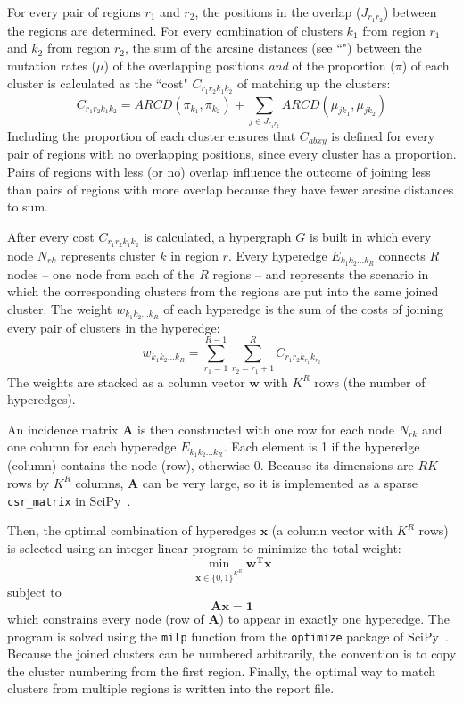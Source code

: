 \documentclass[11pt]{article}
\begin{document}
For every pair of regions $r_1$ and $r_2$, the positions in the overlap ($J_{r_1r_2}$) between the regions are determined.
For every combination of clusters $k_1$ from region $r_1$ and $k_2$ from region $r_2$, the sum of the arcsine distances (see ``") between the mutation rates ($\mu$) of the overlapping positions \emph{and} of the proportion ($\pi$) of each cluster is calculated as the ``cost" $C_{r_1r_2k_1k_2}$ of matching up the clusters:
$$C_{r_1r_2k_1k_2} = ARCD(\pi_{k_1},\pi_{k_2}) + \sum_{j \in J_{r_1r_2}}{ARCD(\mu_{jk_1},\mu_{jk_2})}$$
Including the proportion of each cluster ensures that $C_{abxy}$ is defined for every pair of regions with no overlapping positions, since every cluster has a proportion.
Pairs of regions with less (or no) overlap influence the outcome of joining less than pairs of regions with more overlap because they have fewer arcsine distances to sum.

After every cost $C_{r_1r_2k_1k_2}$ is calculated, a hypergraph $G$ is built in which every node $N_{rk}$ represents cluster $k$ in region $r$.
Every hyperedge $E_{k_1k_2...k_R}$ connects $R$ nodes -- one node from each of the $R$ regions -- and represents the scenario in which the corresponding clusters from the regions are put into the same joined cluster.
The weight $w_{k_1k_2...k_R}$ of each hyperedge is the sum of the costs of joining every pair of clusters in the hyperedge:
$$w_{k_1k_2...k_R} = \sum_{r_1=1}^{R-1}{\sum_{r_2=r_1+1}^R{C_{r_1r_2k_{r_1}k_{r_2}}}}$$
The weights are stacked as a column vector $\mathbf{w}$ with $K^R$ rows (the number of hyperedges).

An incidence matrix $\mathbf{A}$ is then constructed with one row for each node $N_{rk}$ and one column for each hyperedge $E_{k_1k_2...k_R}$.
Each element is 1 if the hyperedge (column) contains the node (row), otherwise 0.
Because its dimensions are $RK$ rows by $K^R$ columns, $\mathbf{A}$ can be very large, so it is implemented as a sparse \verb|csr_matrix| in SciPy~\cite{Virtanen2020}.

Then, the optimal combination of hyperedges $\mathbf{x}$ (a column vector with $K^R$ rows) is selected using an integer linear program to minimize the total weight:
$$\min_{\mathbf{x} \in \{0, 1\}^{K^R}}{\mathbf{w^Tx}}$$
subject to
$$\mathbf{Ax} = \mathbf{1}$$
which constrains every node (row of $\mathbf{A}$) to appear in exactly one hyperedge.
The program is solved using the \verb|milp| function from the \verb|optimize| package of SciPy~\cite{Virtanen2020}.
Because the joined clusters can be numbered arbitrarily, the convention is to copy the cluster numbering from the first region.
Finally, the optimal way to match clusters from multiple regions is written into the report file.


\newpage
\begin{singlespace}
	
	
\end{singlespace}
\end{document}
